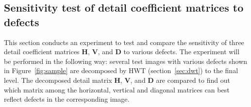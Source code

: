 \subsection{Sensitivity test of detail coefficient matrices to defects}
\label{subsec:hvd_experiment}
This section conducts an experiment to test and compare the sensitivity of three detail coefficient matrices $\mathbf H$, $\mathbf V$, and $\mathbf D$ to various defects. The experiment will be performed in the following way: several test images with various defects shown in Figure~\ref{fig:sample} are decomposed by HWT (section~\ref{sec:dwt}) to the final level. The decomposed detail matrix $\mathbf H$, $\mathbf V$, and $\mathbf D$ are compared to find out which matrix among the horizontal, vertical and diagonal matrices can best reflect defects in the corresponding image.


